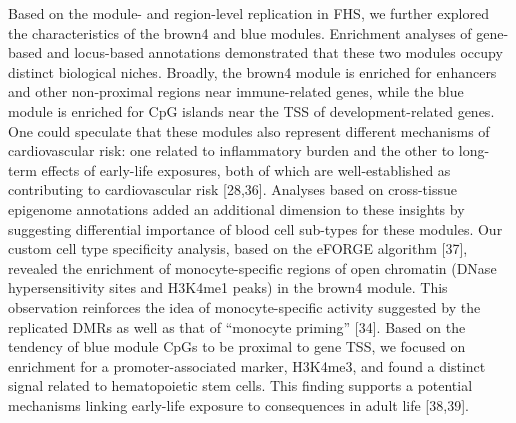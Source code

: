 \documentclass[]{article}
\theoremstyle{definition}
\theoremstyle{definition}
\theoremstyle{definition}
\theoremstyle{remark}
\begin{document}
Based on the module- and region-level replication in FHS, we further
explored the characteristics of the brown4 and blue modules. Enrichment
analyses of gene-based and locus-based annotations demonstrated that
these two modules occupy distinct biological niches. Broadly, the brown4
module is enriched for enhancers and other non-proximal regions near
immune-related genes, while the blue module is enriched for CpG islands
near the TSS of development-related genes. One could speculate that
these modules also represent different mechanisms of cardiovascular
risk: one related to inflammatory burden and the other to long-term
effects of early-life exposures, both of which are well-established as
contributing to cardiovascular risk {[}28,36{]}. Analyses based on
cross-tissue epigenome annotations added an additional dimension to
these insights by suggesting differential importance of blood cell
sub-types for these modules. Our custom cell type specificity analysis,
based on the eFORGE algorithm {[}37{]}, revealed the enrichment of
monocyte-specific regions of open chromatin (DNase hypersensitivity
sites and H3K4me1 peaks) in the brown4 module. This observation
reinforces the idea of monocyte-specific activity suggested by the
replicated DMRs as well as that of ``monocyte priming'' {[}34{]}. Based
on the tendency of blue module CpGs to be proximal to gene TSS, we
focused on enrichment for a promoter-associated marker, H3K4me3, and
found a distinct signal related to hematopoietic stem cells. This
finding supports a potential mechanisms linking early-life exposure to
consequences in adult life {[}38,39{]}.
\end{document}
